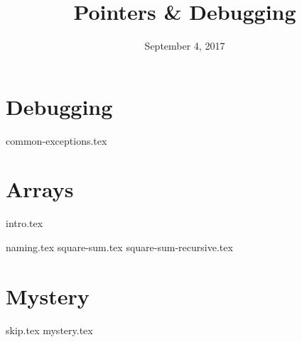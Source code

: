 \documentclass[11pt]{exam}
\title{Pointers \& Debugging}
\date{September 4, 2017}
\begin{document}
\maketitle

\section{Debugging}
\begin{questions}
{common-exceptions.tex}
\end{questions}

\section{Arrays}
{intro.tex}
\begin{questions}
{naming.tex}
{square-sum.tex}
{square-sum-recursive.tex}
\end{questions}

\section{Mystery}
\begin{questions}
{skip.tex}
{mystery.tex}
\end{questions}
\end{document}
